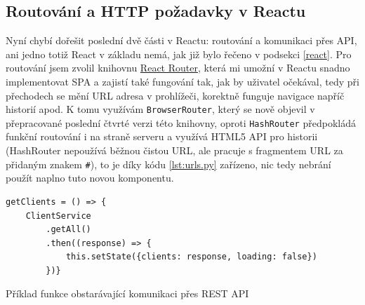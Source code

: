     \subsection{Routování a HTTP požadavky v Reactu}
    Nyní chybí dořešit poslední dvě části v Reactu: routování a komunikaci přes API, ani jedno totiž React v základu nemá, jak již bylo řečeno v podsekci \ref{react}. Pro routování jsem zvolil knihovnu \href{https://reacttraining.com/}{React Router}, která mi umožní v Reactu snadno implementovat SPA a zajistí také fungování tak, jak by uživatel očekával, tedy při přechodech se mění URL adresa v prohlížeči, korektně funguje navigace napříč historií apod. K tomu využívám \verb|BrowserRouter|, který se nově objevil v přepracované poslední čtvrté verzi této knihovny, oproti \verb|HashRouter| předpokládá funkční routování i na straně serveru a využívá HTML5 API pro historii (HashRouter nepoužívá běžnou čistou URL, ale pracuje s fragmentem URL za přidaným znakem \verb|#|), to je díky kódu \ref{lst:urls.py} zařízeno, nic tedy nebrání použít naplno tuto novou komponentu.
    
    \begin{listing}[ht]
    	\begin{verbatim}
getClients = () => {
    ClientService
        .getAll()
        .then((response) => {
            this.setState({clients: response, loading: false})
        })}
    	\end{verbatim}
    	\caption{Příklad funkce obstarávající komunikaci přes REST API}\label{lst:react3}
    \end{listing}
    
